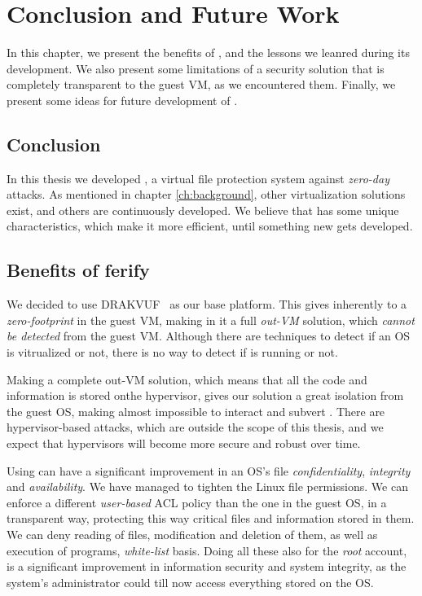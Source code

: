 
\chapter{Conclusion and Future Work}\label{ch:chapter5}

\par In this chapter, we present the benefits of , and the lessons we leanred during its development. We also present some limitations of a security solution that is completely transparent to the guest \ac{VM}, as we encountered them. Finally, we present some ideas for future development of .

\section{Conclusion}

\par In this thesis we developed , a virtual file protection system against \emph{zero-day} attacks. As mentioned in chapter \ref{ch:background}, other virtualization solutions exist, and others are continuously developed. We believe that  has some unique characteristics, which make it more efficient, until something new gets developed.

\section{Benefits of ferify}

\par We decided to use DRAKVUF~\cite{lengyel2014drakvuf} as our base platform. This gives inherently to  a \emph{zero-footprint} in the guest \ac{VM}, making in it a full \emph{out-\ac{VM}} solution, which \emph{cannot be detected} from the guest \ac{VM}. Although there are techniques to detect if an \ac{OS} is vitrualized or not, there is no way to detect if  is running or not.

\par Making  a complete out-\ac{VM} solution, which means that all the code and information is stored onthe hypervisor, gives our solution a great isolation from the guest \ac{OS}, making almost impossible to interact and subvert . There are hypervisor-based attacks, which are outside the scope of this thesis, and we expect that hypervisors will become more secure and robust over time.

\par Using  can have a significant improvement in an \ac{OS}'s file \emph{confidentiality}, \emph{integrity} and \emph{availability}. We have managed to tighten the Linux file permissions. We can enforce a different \emph{user-based}  \ac{ACL} policy than the one in the guest \ac{OS}, in a transparent way, protecting this way critical files and information stored in them. We can deny reading of files, modification and deletion of them, as well as execution of programs,  \emph{white-list} basis. Doing all these also for the \emph{root} account, is a significant improvement in information security and system integrity, as the system's administrator could till now access everything stored on the \ac{OS}.

